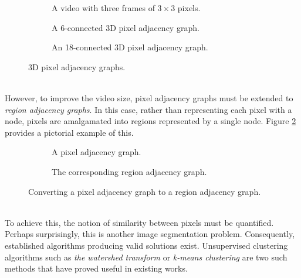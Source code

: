 \begin{figure}[h!]
    \centering
    \begin{subfigure}[b]{0.29\textwidth}
        \centering
        \captionsetup{justification=centering}
        \scalebox{1}{}
        \caption{A video with three frames of $3 \times 3$ pixels.}
    \end{subfigure} \hfill%
    \begin{subfigure}[b]{0.29\textwidth}
        \centering
        \captionsetup{justification=centering}
        \scalebox{0.5}{}
        \caption{A 6-connected 3D pixel adjacency graph.}
    \end{subfigure} \hfill%
    \begin{subfigure}[b]{0.29\textwidth}
        \centering
        \captionsetup{justification=centering}
        \scalebox{0.5}{}
        \caption{An 18-connected 3D pixel adjacency graph.}
    \end{subfigure}%
    \caption[3D Pixel Adjacency Graphs]{3D pixel adjacency graphs.}
    \label{fig:3dAdjacency}
\end{figure}
\smallskip \\ \indent
However, to improve the video size, pixel adjacency graphs must be extended to \textit{region adjacency graphs}. In this case, rather than representing each pixel with a node, pixels are amalgamated into regions represented by a single node. Figure \ref{fig:pixelToRegion} provides a pictorial example of this.
\begin{figure}[h!]
    \centering
    \begin{subfigure}[b]{0.49\textwidth}
        \centering
        \captionsetup{justification=centering}
        \scalebox{0.5}{}
        \caption{A pixel adjacency graph.}
    \end{subfigure}
    \hfill
    \begin{subfigure}[b]{0.49\textwidth}
        \centering
        \captionsetup{justification=centering}
        \scalebox{0.5}{}
        \caption{The corresponding region adjacency graph.}
    \end{subfigure}
    \caption[Pixel to Region Conversion]{Converting a pixel adjacency graph to a region adjacency graph.}
    \label{fig:pixelToRegion}
\end{figure}
\smallskip \\ \indent
To achieve this, the notion of similarity between pixels must be quantified. Perhaps surprisingly, this is another image segmentation problem. Consequently, established algorithms producing valid solutions exist. Unsupervised clustering algorithms such as \textit{the watershed transform} \cite{Watershed} or \textit{k-means clustering} \cite{KMeans} are two such methods that have proved useful in existing works.
